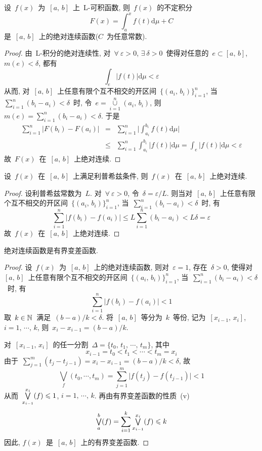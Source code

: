 \begin{example} \label{ex531}
设~$f(x)$~为~$[a,\,b]$~上~L-可积函数, 则~$f(x)$~的不定积分
\[
F(x) = \int_a^x f(t) \mathrm{d} \mu + C
\]
是~$[a,\,b]$~上的绝对连续函数($C$~为任意常数).
\end{example}

\begin{proof}
由~L-积分的绝对连续性, 对~$\forall~\varepsilon > 0$, $\exists~\delta >0$~使得对任意的~$e \subset [a,\,b]$, $m(e) < \delta$, 都有
\[
\int_e \big|f(t)\big| \mathrm{d} \mu < \varepsilon
\]
从而, 对~$[a,\,b]$~上任意有限个互不相交的开区间~$\big\{(a_i,\,b_i)\big\}_{i=1}^n$, 当~$\sum\limits_{i=1}^n (b_i-a_i) < \delta$~时, 令~$e = \mathop{\cup}\limits_{i=1}^n (a_i,\,b_i)$, 则~$m(e)=\sum\limits_{i=1}^n (b_i - a_i) < \delta$. 于是
\begin{eqnarray*}
\sum_{i=1}^n \big| F(b_i)-F(a_i) \big| &=& \sum_{i=1}^n \Big| \int_{a_i}^{b_i} f(t) \mathrm{d} \mu \Big| \\
&\leqslant& \sum_{i=1}^n \int_{a_i}^{b_i} \big| f(t) \big| \mathrm{d} \mu  = \int_e \big|f(t)\big| \mathrm{d} \mu < \varepsilon
\end{eqnarray*}
故~$F(x)$~在~$[a,\,b]$~上绝对连续.
\end{proof}

\begin{example}
设~$f(x)$~在~$[a,\,b]$~上满足利普希兹条件, 则~$f(x)$~在~$[a,\,b]$~上绝对连续.
\end{example}

\begin{proof}
设利普希兹常数为~$L$. 对~$\forall~\varepsilon > 0$, 令~$\delta = \varepsilon / L$. 则当对~$[a,\,b]$~上任意有限个互不相交的开区间~$\big\{(a_i,\,b_i)\big\}_{i=1}^n$, 当~$\sum\limits_{i=1}^n (b_i-a_i) < \delta$~时, 有
\[
\sum_{i=1}^n \big| f(b_i)-f(a_i) \big| \leqslant L \sum_{i=1}^n (b_i - a_i) < L \delta = \varepsilon
\]
故~$f(x)$~在~$[a,\,b]$~上绝对连续.
\end{proof}

\begin{theorem} \label{thm531}
绝对连续函数是有界变差函数.
\end{theorem}

\begin{proof}
设~$f(x)$~为~$[a,\,b]$~上的绝对连续函数, 则对~$\varepsilon = 1$, 存在~$\delta > 0$, 使得对~$[a,\,b]$~上任意有限个互不相交的开区间~$\big\{(a_i,\,b_i)\big\}_{i=1}^n$, 当~$\sum\limits_{i=1}^n (b_i-a_i) < \delta$~时, 有
\[
\sum_{i=1}^n \big| f(b_i)-f(a_i) \big| < 1
\]
取~$k \in \mathbb{N}$~满足~$(b-a)/k < \delta$. 将~$[a,\,b]$~等分为~$k$~等份, 记为~$[x_{i-1},\,x_i]$,
$i=1,\,\cdots,\,k$, 则~$x_i - x_{i-1} = (b-a)/k$.

对~$[x_{i-1},\,x_i]$~的任一分割~$\Delta = \{t_0,\,t_1,\,\cdots,\,t_m\}$, 其中
\[
x_{i-1} = t_0 < t_1 < \cdots < t_m = x_i
\]
由于~$\sum\limits_{j=1}^m (t_j - t_{j-1}) = x_i - x_{i-1} = (b-a)/k < \delta$, 故
\[
{\textstyle{\bigvee}}_{f}(t_0,\cdots,t_m) = \sum_{j=1}^m \big| f(t_j) - f(t_{j-1}) \big| < 1
\]
从而~$\mathop{\textstyle{\bigvee}}\limits_{x_{i-1}}^{x_i}(f) \leqslant 1$, $i = 1,\,\cdots,\,k$. 再由有界变差函数的性质~(v)
\[
\mathop{\textstyle{\bigvee}}_a^b(f) = \sum_{i=1}^k \mathop{\textstyle{\bigvee}}_{x_{i-1}}^{x_i}(f) \leqslant k
\]
因此, $f(x)$~是~$[a,\,b]$~上的有界变差函数.
\end{proof}

